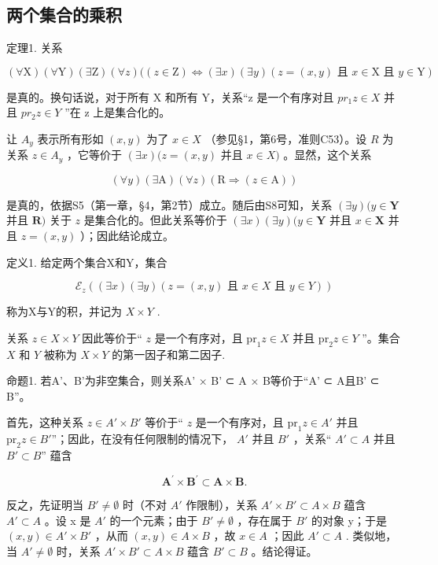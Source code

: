 \subsection{两个集合的乘积}

定理1. 关系

\[
(\forall \mathrm{X}) (\forall \mathrm{Y}) (\exists \mathrm{Z}) (\forall z) ((z \in \mathrm{Z}) \iff (\exists x) (\exists y) (z = (x, y) \text {   且   } x \in \mathrm{X} \text {   且   } y \in \mathrm{Y})
\]

是真的。换句话说，对于所有 X 和所有 Y，关系“z 是一个有序对且 \(pr_{1}z \in X\) 并且 \(pr_{2}z \in Y\) ”在 z 上是集合化的。

让 \(A_y\) 表示所有形如 \((x, y)\) 为了 \(x \in X\) （参见§1，第6号，准则C53）。设 \(R\) 为关系 \(z \in A_y\) ，它等价于 \((\exists x)(z = (x, y)\) 并且 \(x \in X)\) 。显然，这个关系

\[
(\forall y) (\exists \mathrm{A}) (\forall z) (\mathrm{R} \Longrightarrow (z \in \mathrm{A}))
\]

是真的，依据S5（第一章，§4，第2节）成立。随后由S8可知，关系 \((\exists y)(y \in \mathbf{Y}\) 并且 \(\mathbf{R})\) 关于 \(z\) 是集合化的。但此关系等价于 \((\exists x)(\exists y)(y \in \mathbf{Y}\) 并且 \(x \in \mathbf{X}\) 并且 \(z = (x, y)\) ）；因此结论成立。

定义1. 给定两个集合X和Y，集合

\[
\mathcal {E} _ {z} ((\exists x) (\exists y) (z = (x, y) \text {   且   } x \in X \text {   且   } y \in Y))
\]

称为X与Y的积，并记为 \(X \times Y\) .

关系 \(z \in X \times Y\) 因此等价于“ \(z\) 是一个有序对，且 \(\text{pr}_1z \in X\) 并且 \(\text{pr}_2z \in Y\) ''。集合 \(X\) 和 \(Y\) 被称为 \(X \times Y\) 的第一因子和第二因子.

命题1. 若A'、B'为非空集合，则关系A' × B' ⊂ A × B等价于“A' ⊂ A且B' ⊂ B”。

首先，这种关系 \(z \in A' \times B'\) 等价于“ \(z\) 是一个有序对，且 \(\mathrm{pr}_1z \in A'\) 并且 \(\mathrm{pr}_2z \in B'\)''；因此，在没有任何限制的情况下， \(A'\) 并且 \(B'\) ，关系“ \(A' \subset A\) 并且 \(B' \subset B\)'' 蕴含

\[
\mathbf {A} ^ {\prime} \times \mathbf {B} ^ {\prime} \subset \mathbf {A} \times \mathbf {B}.
\]

反之，先证明当 \(B' \neq \emptyset\) 时（不对 \(A'\) 作限制），关系 \(A' \times B' \subset A \times B\) 蕴含 \(A' \subset A\) 。设 x 是 \(A'\) 的一个元素；由于 \(B' \neq \emptyset\) ，存在属于 \(B'\) 的对象 y；于是 \((x, y) \in A' \times B'\) ，从而 \((x, y) \in A \times B\) ，故 \(x \in A\) ；因此 \(A' \subset A\) . 类似地，当 \(A' \neq \emptyset\) 时，关系 \(A' \times B' \subset A \times B\) 蕴含 \(B' \subset B\) 。结论得证。

